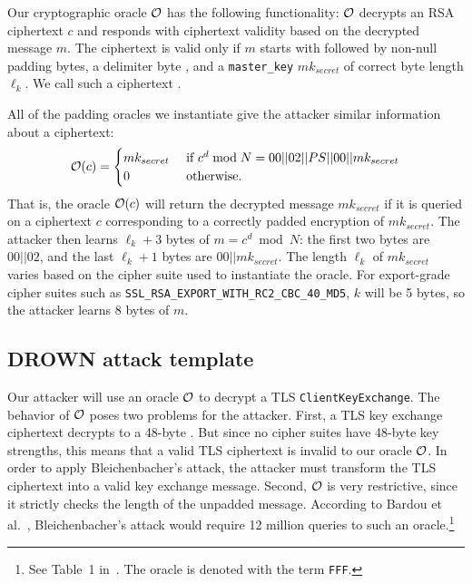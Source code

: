 Our cryptographic oracle $\mathcal{O}$ has the following functionality: 
$\mathcal{O}$ decrypts an RSA ciphertext $c$ and responds with ciphertext validity based on the decrypted message $m$.  
The ciphertext is valid only if $m$ starts with  followed by non-null padding bytes, a delimiter byte , and a \texttt{master\_key} $mk_{secret}$ of correct byte length $\ell_k$.
We call such a ciphertext \textit{\sslconform}.

All of the \ssltwo padding oracles we instantiate give the attacker similar information about a \PKCSconform \ssltwo ciphertext:
\begin{equation*} 
\mathcal{O}(c) =  
\begin{cases} 
mk_{secret} & \text{ if } c^d \bmod N = 00 || 02 || PS || 00 || mk_{secret}  \\ 
0 & \text{ otherwise.} 
\end{cases} 
\end{equation*}
That is, the oracle $\mathcal{O}(c)$ will return the decrypted message $mk_{secret}$ if it is queried on a \PKCSconform \ssltwo ciphertext $c$ corresponding to a correctly \PKCS padded encryption of $mk_{secret}$.  The attacker then learns $\ell_k + 3$ bytes of $m = c^d \bmod N$: the first two bytes are $00 || 02$, and the last $\ell_k+1$ bytes are $00 || mk_{secret}$.  The length $\ell_k$ of $mk_{secret}$ varies based on the cipher suite used to instantiate the oracle.  For export-grade cipher suites such as \texttt{SSL\_RSA\_EXPORT\_WITH\_RC2\_CBC\_40\_MD5},
$k$ will be 5 bytes, so the attacker learns 8 bytes of $m$.

\subsection{DROWN attack template}
\label{sec:adapted-bb-compact}
Our attacker will use an \ssltwo oracle $\mathcal{O}$ to decrypt a TLS \texttt{ClientKeyExchange}.  
The behavior of $\mathcal{O}$ poses two problems for the attacker. First, a TLS key exchange ciphertext decrypts to a 48-byte \pms. But since no \ssltwo cipher suites have 48-byte key strengths, this means that a valid TLS ciphertext is invalid to our oracle $\mathcal{O}$. 
In order to apply Bleichenbacher's attack, the attacker must transform the TLS ciphertext into a valid \ssltwo key exchange message. Second, $\mathcal{O}$ is very restrictive, since it strictly checks the length of the unpadded message. 
According to Bardou et al.~\cite{bardou2012efficient}, Bleichenbacher's attack would require 12 million queries to such an oracle.\footnote{See Table~1 in~\cite{bardou2012efficient}. The oracle is denoted with the term \texttt{FFF}.} 

